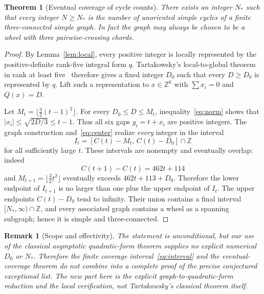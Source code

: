 \documentclass[9pt,a4paper,twocolumn]{extarticle}
\newtheorem{theorem}{Theorem}
\newtheorem{remark}{Remark}
\begin{document}
\begin{theorem}[Eventual coverage of cycle counts]\label{thm:cofinite}
There exists an integer $N_*$ such that every integer $N\geq N_*$ is the number of unoriented simple cycles of a finite three-connected simple graph. In fact the graph may always be chosen to be a wheel with three pairwise-crossing chords.
\end{theorem}
\begin{proof}
By Lemma~\ref{lem:local}, every positive integer is locally represented by the positive-definite rank-five integral form $q$. Tartakowsky's local-to-global theorem in rank at least five~\cite{Tartakowsky,Hanke,HSKK} therefore gives a fixed integer $D_0$ such that every $D\geq D_0$ is represented by $q$. Lift such a representation to $x\in\mathbb Z^6$ with $\sum x_i=0$ and $Q(x)=D$.

Let $M_t=\lfloor\tfrac32(t-1)^2\rfloor$. For every $D_0\leq D\leq M_t$, inequality~\eqref{eq:norm} shows that $|x_i|\leq\sqrt{2D/3}\leq t-1$. Thus all six gaps $g_i=t+x_i$ are positive integers. The graph construction and~\eqref{eq:center} realize \emph{every} integer in the interval
\begin{equation}\label{eq:intervalt}
I_t=[C(t)-M_t,\,C(t)-D_0]\cap\mathbb Z
\end{equation}
for all sufficiently large $t$. These intervals are nonempty and eventually overlap: indeed
\begin{equation}\label{eq:overlap}
C(t+1)-C(t)=462t+114
\end{equation}
and $M_{t+1}=\lfloor\tfrac32t^2\rfloor$ eventually exceeds $462t+113+D_0$. Therefore the lower endpoint of $I_{t+1}$ is no larger than one plus the upper endpoint of $I_t$. The upper endpoints $C(t)-D_0$ tend to infinity. Their union contains a final interval $[N_*,\infty)\cap\mathbb Z$, and every associated graph contains a wheel as a spanning subgraph; hence it is simple and three-connected.
\end{proof}

\begin{remark}[Scope and effectivity]
The statement is unconditional, but our use of the classical asymptotic quadratic-form theorem supplies no explicit numerical $D_0$ or $N_*$. Therefore the finite coverage interval~\eqref{eq:interval} and the eventual-coverage theorem do not combine into a complete proof of the precise conjectured exceptional list. The new part here is the explicit graph-to-quadratic-form reduction and the local verification, not Tartakowsky's classical theorem itself.
\end{remark}
\end{document}
